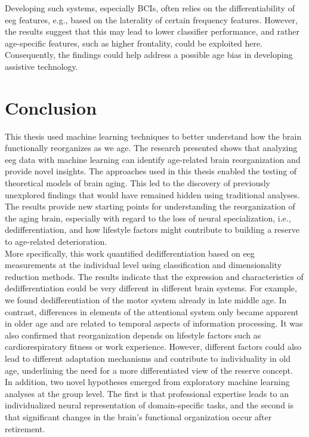 Developing such systems, especially BCIs, often relies on the differentiability of \gls{eeg} features, e.g., based on the laterality of certain frequency features. However, the results suggest that this may lead to lower classifier performance, and rather age-specific features, such as higher frontality, could be exploited here. Consequently, the findings could help address a possible age bias in developing assistive technology.

\section{Conclusion}
This thesis used machine learning techniques to better understand how the brain functionally reorganizes as we age. The research presented shows that analyzing \gls{eeg} data with machine learning can identify age-related brain reorganization and provide novel insights. The approaches used in this thesis enabled the testing of theoretical models of brain aging. This led to the discovery of previously unexplored findings that would have remained hidden using traditional analyses. The results provide new starting points for understanding the reorganization of the aging brain, especially with regard to the loss of neural specialization, i.e., dedifferentiation, and how lifestyle factors might contribute to building a reserve to age-related deterioration.\\
More specifically, this work quantified dedifferentiation based on \gls{eeg} measurements at the individual level using classification and dimensionality reduction methods. The results indicate that the expression and characteristics of dedifferentiation could be very different in different brain systems. For example, we found dedifferentiation of the motor system already in late middle age. In contrast, differences in elements of the attentional system only became apparent in older age and are related to temporal aspects of information processing. It was also confirmed that reorganization depends on lifestyle factors such as cardiorespiratory fitness or work experience. However, different factors could also lead to different adaptation mechanisms and contribute to individuality in old age, underlining the need for a more differentiated view of the reserve concept.\\
In addition, two novel hypotheses emerged from exploratory machine learning analyses at the group level. The first is that professional expertise leads to an individualized neural representation of domain-specific tasks, and the second is that significant changes in the brain's functional organization occur after retirement.\\
